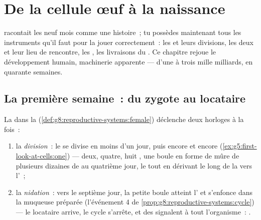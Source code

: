 \chapter{De la cellule œuf à la naissance}\label{ch:g8:from-egg-to-birth}

 racontait les neuf mois comme une
histoire~; tu possèdes maintenant tous les instruments qu'il faut
pour la jouer correctement~: les  et leurs divisions, les
deux  et leur lieu de rencontre, les , les livraisons
du . Ce chapitre rejoue le développement humain, machinerie
apparente --- d'une  à trois mille milliards, en quarante
semaines.

\section{La première semaine~: du zygote au locataire}

\begin{proposition}\label{prop:g8:from-egg-to-birth:firstweek}
La  dans la 
(\cref{def:g8:reproductive-systems:female}) déclenche deux horloges
à la fois~:
\begin{enumerate}
  \item la \emph{division}~: le  se divise en moins d'un jour,
        puis encore et encore
        (\cref{ex:g5:first-look-at-cells:one}) --- deux, quatre,
        huit , une boule en forme de mûre de plusieurs
        dizaines de  au quatrième jour, le tout en dérivant
        le long de la  vers l'~;
  \item la \emph{nidation}~: vers le septième jour, la petite boule
        atteint l' et s'enfonce dans la muqueuse préparée
        (l'événement 4 de
        \cref{prop:g8:reproductive-systems:cycle}) --- le locataire
        arrive, le cycle s'arrête, et des  signalent à tout
        l'organisme~: .
\end{enumerate}
\end{proposition}
\admitted

